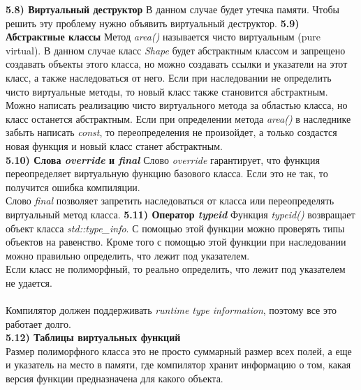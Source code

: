 \documentclass{article}
\begin{document}
\noindent \textbf{5.8) Виртуальный деструктор}
В данном случае будет утечка памяти. Чтобы решить эту проблему нужно объявить виртуальный деструктор.
\noindent \textbf{5.9) Абстрактные классы}
Метод \textit{area()} называется чисто виртуальным (pure virtual). В данном случае класс \textit{Shape} будет абстрактным классом и запрещено создавать объекты этого класса, но можно создавать ссылки и указатели на этот класс, а также наследоваться от него. Если при наследовании не определить чисто виртуальные методы, то новый класс также становится абстрактным.
Можно написать реализацию чисто виртуального метода за областью класса, но класс останется абстрактным.
Если при определении метода \textit{area()} в наследнике забыть написать \textit{const}, то переопределения не произойдет, а только создастся новая функция и новый класс станет абстрактным.\\
\noindent \textbf{5.10) Слова \textit{override} и \textit{final}}
Слово \textit{override} гарантирует, что функция переопределяет виртуальную функцию базового класса. Если это не так, то получится ошибка компиляции.\\
Слово \textit{final} позволяет запретить наследоваться от класса или переопределять виртуальный метод класса.
\noindent \textbf{5.11) Оператор \textit{typeid}}
Функция \textit{typeid()} возвращает объект класса \textit{std::type\_info}. С помощью этой функции можно проверять типы объектов на равенство.
Кроме того с помощью этой функции при наследовании можно правильно определить, что лежит под указателем.\\
Если класс не полиморфный, то реально определить, что лежит под указателем не удается.\\\\
Компилятор должен поддерживать \textit{runtime type information}, поэтому все это работает долго.\\
\noindent \textbf{5.12) Таблицы виртуальных функций}\\
Размер полиморфного класса это не просто суммарный размер всех полей, а еще и указатель на место в памяти, где компилятор хранит информацию о том, какая версия функции предназначена для какого объекта. 
\end{document}
